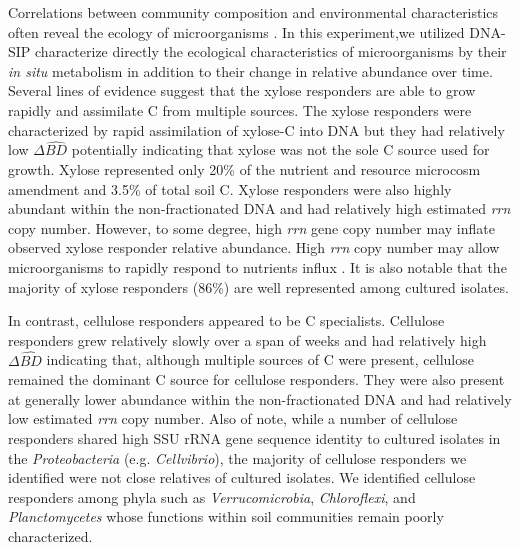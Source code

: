Correlations between community composition and environmental characteristics
often reveal the ecology of microorganisms \citep{Fierer2007}. In this experiment,we utilized
DNA-SIP characterize directly the ecological characteristics of microorganisms
by their \textit{in situ} metabolism in addition to their change in relative
abundance over time. Several lines of evidence suggest that the xylose
responders are able to grow rapidly and assimilate C from
multiple sources. The xylose responders were characterized by rapid
assimilation of xylose-C into DNA but they had relatively low $\Delta\hat{BD}$
potentially indicating that xylose was not the sole C source used for growth.
Xylose represented only 20\% of the nutrient and resource microcosm amendment
and 3.5\% of total soil C. Xylose responders were also highly
abundant within the non-fractionated DNA and had relatively high estimated
\textit{rrn} copy number. However, to some degree, high \textit{rrn} gene copy
number may inflate observed xylose responder relative abundance. High
\textit{rrn} copy number may allow microorganisms to rapidly respond to
nutrients influx \citep{Klappenbach_2000}. It is also notable that the
majority of xylose responders (86\%) are well represented among cultured
isolates. 

In contrast, cellulose responders appeared to be C specialists.
Cellulose responders grew relatively slowly over a span of weeks and had
relatively high $\Delta\hat{BD}$ indicating that, although multiple sources of
C were present, cellulose remained the dominant C source for cellulose
responders. They were also present at generally lower abundance within the
non-fractionated DNA and had relatively low estimated \textit{rrn} copy number.
Also of note, while a number of cellulose responders shared high SSU rRNA gene
sequence identity to cultured isolates in the \textit{Proteobacteria} (e.g.
\textit{Cellvibrio}), the majority of cellulose responders we identified were
not close relatives of cultured isolates. We identified cellulose responders
among phyla such as \textit{Verrucomicrobia}, \textit{Chloroflexi}, and
\textit{Planctomycetes} whose functions within soil communities remain poorly
characterized.


